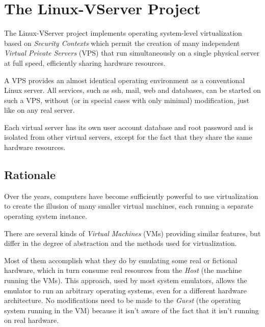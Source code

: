\chapter{The Linux-VServer Project}



The Linux-VServer project implements operating system-level virtualization
based on \textit{Security Contexts} which permit the creation of many
independent \textit{Virtual Private Servers} (VPS) that run simultaneously on a
single physical server at full speed, efficiently sharing hardware resources.

A VPS provides an almost identical operating environment as a conventional
Linux server. All services, such as ssh, mail, web and databases, can be
started on such a VPS, without (or in special cases with only minimal)
modification, just like on any real server.

Each virtual server has its own user account database and root password and is
isolated from other virtual servers, except for the fact that they share the
same hardware resources.


\section{Rationale}

Over the years, computers have become sufficiently powerful to use
virtualization to create the illusion of many smaller virtual machines, each
running a separate operating system instance.

There are several kinds of \textit{Virtual Machines} (VMs) providing similar
features, but differ in the degree of abstraction and the methods used for
virtualization.

Most of them accomplish what they do by emulating some real or fictional
hardware, which in turn consume real resources from the \textit{Host} (the
machine running the VMs). This approach, used by most system emulators, allows
the emulator to run an arbitrary operating systems, even for a different
hardware architecture. No modifications need to be made to the \textit{Guest}
(the operating system running in the VM) because it isn't aware of the fact
that it isn't running on real hardware.

